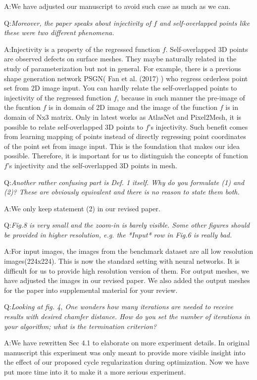 \documentclass[10pt]{letter} %
\begin{document}
	A:We have adjusted our manuscript to avoid such case as much as we can.
	
	Q:\emph{Moreover, the paper speaks about injectivity of $f$ and self-overlapped points like these were two different phenomena.}
	
	A:Injectivity is a property of the regressed function $f$. Self-overlapped 3D points are observed defects on surface meshes. They maybe naturally related in the study of parameterization but not in general. For example, there is a previous shape generation network PSGN( Fan et al. (2017) ) who regress orderless point set from 2D image input. You can hardly relate the self-overlapped points to injectivity of the regressed function $f$, because in such manner the pre-image of the fucntion $f$ is in domain of 2D image and the image of the function $f$ is in domain of Nx3 matrix. Only in latest works as AtlasNet and Pixel2Mesh, it is possible to relate self-overlapped 3D points to $f$'s injectivity. Such benefit comes from learning mapping of points instead of directly regressing point coordinates of the point set from image input. This is the foundation that makes our idea possible. Therefore, it is important for us to distinguish the concepts of function $f$'s injectivity and the self-overlapped 3D points in mesh.
	
	Q:\emph{Another rather confusing part is Def. 1 itself. Why do you formulate (1) and (2)? These are obviously equivalent and there is no reason to state them both.}
	
	A:We only keep statement (2) in our revised paper.
	
	Q:\emph{Fig.8 is very small and the zoom-in is barely visible.  Some other figures should be provided in higher resolution, e.g. the *Input* row in Fig.6 is really bad.} 
	
	A:For input images, the images from the benchmark dataset are all low resolution images(224x224). This is now the standard setting with neural networks. It is difficult for us to provide high resolution version of them.
	For output meshes, we have adjusted the images in our revised paper. We also added the output meshes for the paper into supplemental material for your review.
	
	Q:\emph{Looking at fig. 4, One wonders how many iterations are needed to receive results with desired chamfer distance. How do you set the number of iterations in your algorithm; what is the termination criterion?}
	
	A:We have rewritten Sec 4.1 to elaborate on more experiment details. In original manuscript this experiment was only meant to provide more visible insight into the effect of our proposed cycle regularization during optimization. Now we have put more time into it to make it a more serious experiment. 
	
\end{document}
